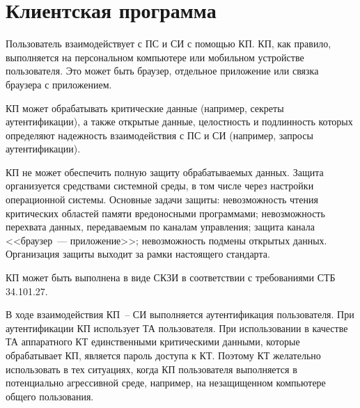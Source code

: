 \section{Клиентская программа}\label{COMMON.CP}

Пользователь взаимодействует с ПС и СИ с помощью КП.
КП, как правило, выполняется на персональном компьютере или мобильном 
устройстве пользователя. Это может быть браузер, отдельное приложение или 
связка браузера с приложением.  

КП может обрабатывать критические данные
(например, секреты аутентификации), а также открытые данные, 
целостность и подлинность которых определяют надежность  
взаимодействия с ПС и СИ (например, запросы аутентификации).

КП не может обеспечить полную защиту обрабатываемых данных. Защита организуется
средствами системной среды, в том числе через настройки операционной системы.
%
Основные задачи защиты: 
невозможность чтения критических областей памяти вредоносными программами;
невозможность перехвата данных, передаваемым по каналам управления; 
защита канала <<браузер~--- приложение>>; 
невозможность подмены открытых данных.
%
Организация защиты выходит за рамки настоящего стандарта.

КП может быть выполнена в виде СКЗИ в соответствии с требованиями СТБ 
34.101.27.

В ходе взаимодействия КП~-- СИ выполняется аутентификация пользователя.
При аутентификации КП использует ТА пользователя. 
%
При использовании в качестве ТА аппаратного КТ единственными критическими
данными, которые обрабатывает КП, является пароль доступа к КТ. Поэтому КТ
желательно использовать в тех ситуациях, когда КП пользователя выполняется в
потенциально агрессивной среде, например, на незащищенном компьютере общего
пользования.
